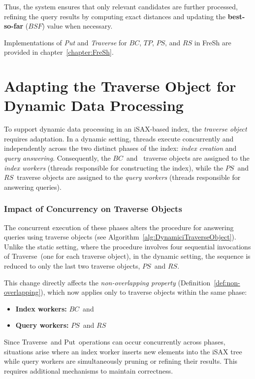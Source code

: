 \documentclass[a4paper,11pt,twoside,openany]{book}
\newcommand{\Put}{\mbox{\sc Put}}
\newcommand{\Traverse}{\mbox{\sc Traverse}}
\newcommand{\BC}{\mbox{$\mathit{BC}$}}
\newcommand{\PS}{\mbox{$\mathit{PS}$}}
\newcommand{\RS}{\mbox{$\mathit{RS}$}}
\begin{document}
Thus, the system ensures that only relevant candidates are further processed,
refining the query results by computing exact distances and updating the
\textbf{best-so-far} ($BSF$) value when necessary.

Implementations of \textit{Put} and \textit{Traverse} for $BC$, $TP$, $PS$, and
$RS$ in FreSh are provided in chapter~\ref{chapter:FreSh}.

\section{Adapting the Traverse Object for Dynamic Data Processing}  

To support dynamic data processing in an iSAX-based index, the
\textit{traverse object} requires adaptation. In a dynamic setting,
threads execute concurrently and independently across the two distinct phases
of the index: \textit{index creation} and \textit{query answering}.
Consequently, the \BC\ and \TP\ traverse objects are assigned to the
\textit{index workers} (threads responsible for constructing the index), while
the \PS\ and \RS\ traverse objects are assigned to the \textit{query workers}
(threads responsible for answering queries).  

\subsubsection{Impact of Concurrency on Traverse Objects}  

The concurrent execution of these phases alters the procedure for answering
queries using traverse objects (see Algorithm~\ref{alg:DynamiciTraverseObject}).
Unlike the static setting, where the procedure involves four sequential
invocations of \Traverse\ (one for each traverse object), in the dynamic
setting, the sequence is reduced to only the last two traverse objects,
\PS\ and \RS.  

This change directly affects the \textit{non-overlapping property}
(Definition~\ref{def:non-overlapping}), which now applies only to traverse
objects within the same phase:  
\begin{itemize}  
    \item \textbf{Index workers:} \BC\ and \TP  
    \item \textbf{Query workers:} \PS\ and \RS  
\end{itemize}  

Since \Traverse\ and \Put\ operations can occur concurrently across phases,
situations arise where an index worker inserts new elements into the iSAX tree
while query workers are simultaneously pruning or refining their results.
This requires additional mechanisms to maintain correctness.  
\end{document}

